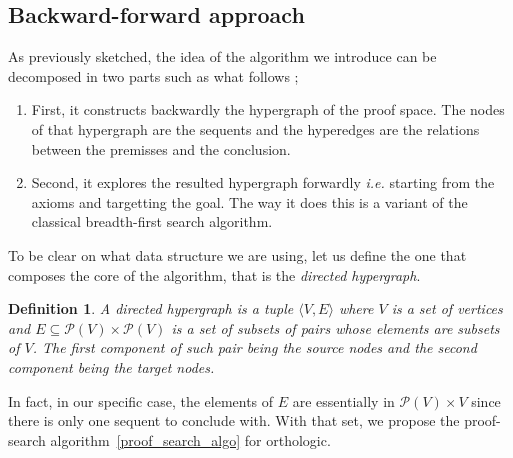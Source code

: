 \documentclass[a4paper, 11pt]{article}
\newtheorem{definition}[theorem]{Definition}
\newcommand{\ie}{ \textit{i.e.} }
\begin{document}
    \subsection{Backward-forward approach}
    As previously sketched, the idea of the algorithm we introduce can be decomposed in two parts such as
    what follows ;
    \begin{enumerate}
	\item
		First, it constructs backwardly the hypergraph of the proof space. The nodes of 
		    that hypergraph 
	are the sequents and the hyperedges are the relations between the premisses and the conclusion. 
	\item
	Second, it explores the resulted hypergraph forwardly \ie starting from the axioms and targetting
	the goal. 
	The way it does this is a variant of the classical breadth-first search algorithm.
    \end{enumerate}
    To be clear on what data structure we are using, let us define the one that composes the core of the
    algorithm, that is the \textit{directed hypergraph}.
    \begin{definition}
	    A directed hypergraph is a tuple $\langle V,E\rangle$ where $V$ is a set of 
	    vertices and $E\subseteq\mathcal{P}(V)\times\mathcal{P}(V)$ is a set of 
	    subsets of pairs whose elements are subsets of $V$. The
	    first component of such pair being the source nodes and the second component being the
	    target nodes.
    \end{definition}
    In fact, in our specific case, the elements of $E$ are essentially in $\mathcal{P}(V)\times V$ since
    there is only one sequent to conclude with. With that set, we propose the proof-search 
    algorithm~\ref{proof_search_algo} for orthologic.
\end{document}
